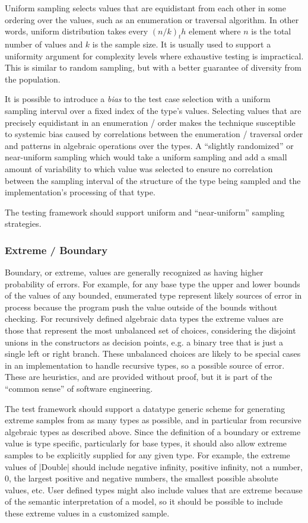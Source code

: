 Uniform sampling selects values that are equidistant from each other
in some ordering over the values, such as an enumeration or traversal algorithm.
In other words, uniform distribution takes every $ (n / k)_th $ element where
$n$ is the total number of values and $ k $ is the sample size.
It is usually used to support a uniformity argument
for complexity levels where exhaustive testing is impractical.
This is similar to random sampling,
but with a better guarantee of diversity from the population.

It is possible to introduce a \emph{bias} to the test case selection
with a uniform sampling interval over a fixed index of the type's values.
Selecting values that are precisely equidistant in an enumeration / order
makes the technique susceptible to systemic bias caused by correlations between
the enumeration / traversal order and patterns in algebraic operations over the types.
A ``slightly randomized'' or near-uniform sampling which 
would take a uniform sampling and add 
a small amount of variability to which value was selected to ensure 
no correlation between the sampling interval of the structure of the type being sampled
and the implementation's processing of that type.

The testing framework should support uniform and ``near-uniform'' sampling strategies.

\subsubsection{ Extreme / Boundary}


Boundary, or extreme, values are generally recognized as having higher probability of errors.
For example, for any base type the upper and lower bounds of the values
of any bounded, enumerated type represent likely sources of error
in process because the program push the value outside of the bounds without checking.
For recursively defined algebraic data types
the extreme values are those that represent the most unbalanced set of choices,
considering the disjoint unions in the constructors as decision points,
e.g. a binary tree that is just a single left or right branch.
These unbalanced choices are likely to be special cases in
an implementation to handle recursive types,
so a possible source of error.
These are heuristics, and are provided without proof,
but it is part of the ``common sense'' of software engineering.

The test framework should support a datatype generic scheme
for generating extreme samples from as many types as possible,
and in particular from recursive algebraic types as described above.
Since the definition of a boundary or extreme value is type specific,
particularly for base types, 
it should also allow extreme samples to be 
explicitly supplied for any given type.
For example,
the extreme values of  |Double| should include negative infinity,
positive infinity, not a number, 0, the largest positive and negative numbers,
the smallest possible absolute values, etc.
User defined types might also include values that are extreme because
of the semantic interpretation of a model,
so it should be possible to include these extreme values in a customized sample.


